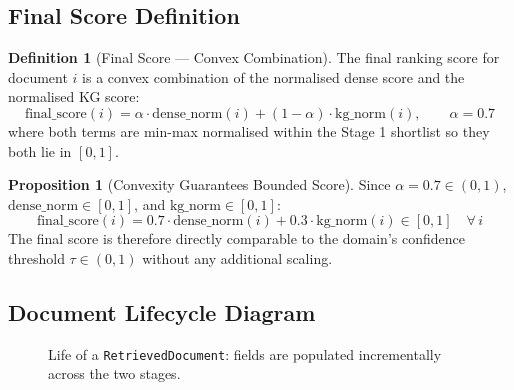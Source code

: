 \documentclass[12pt,a4paper]{article}
\theoremstyle{definition}
\newtheorem{definition}[theorem]{Definition}
\newtheorem{proposition}[theorem]{Proposition}
\theoremstyle{remark}
\begin{document}
\subsection{Final Score Definition}

\begin{definition}[Final Score --- Convex Combination]
The final ranking score for document $i$ is a convex combination of the
normalised dense score and the normalised KG score:
\[
  \boxed{
    \text{final\_score}(i)
    = \alpha \cdot \text{dense\_norm}(i) + (1-\alpha) \cdot \text{kg\_norm}(i),
    \qquad \alpha = 0.7
  }
\]
where both terms are min-max normalised within the Stage 1 shortlist
so they both lie in $[0, 1]$.
\end{definition}

\begin{proposition}[Convexity Guarantees Bounded Score]
Since $\alpha = 0.7 \in (0,1)$, $\text{dense\_norm} \in [0,1]$, and
$\text{kg\_norm} \in [0,1]$:
\[
  \text{final\_score}(i)
  = 0.7 \cdot \text{dense\_norm}(i) + 0.3 \cdot \text{kg\_norm}(i)
  \in [0, 1] \quad \forall\, i
\]
The final score is therefore directly comparable to the domain's
confidence threshold $\tau \in (0,1)$ without any additional scaling.
\end{proposition}

\subsection{Document Lifecycle Diagram}

\begin{figure}[H]
\centering
{}
\caption{Life of a \texttt{RetrievedDocument}: fields are populated
incrementally across the two stages.}
\label{fig:doc_lifecycle}
\end{figure}
\end{document}
